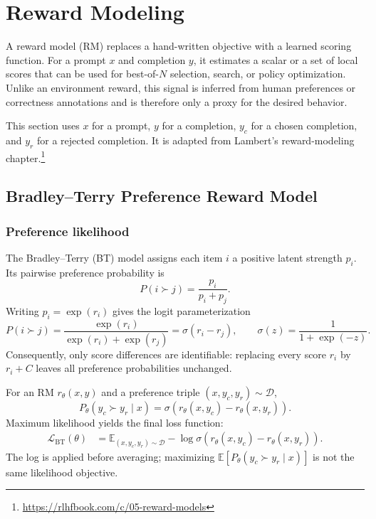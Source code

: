 \section{Reward Modeling}
\label{sec:reward-modeling}

A reward model (RM) replaces a hand-written objective with a learned scoring function.  For a prompt $x$ and completion $y$, it estimates a scalar or a set
of local scores that can be used for best-of-$N$ selection, search, or policy optimization.  Unlike an environment reward, this signal is inferred from human preferences or correctness annotations and is therefore only a proxy for the desired behavior.

This section uses $x$ for a prompt, $y$ for a completion, $y_c$ for a chosen completion, and $y_r$ for a rejected completion.  It is adapted from Lambert's reward-modeling chapter.\footnote{
\url{https://rlhfbook.com/c/05-reward-models}}

\subsection{Bradley--Terry Preference Reward Model}

\subsubsection{Preference likelihood}

The Bradley--Terry (BT) model assigns each item $i$ a positive latent strength
$p_i$.  Its pairwise preference probability is
\begin{equation}
    P(i \succ j)
    =
    \frac{p_i}{p_i+p_j}.
\end{equation}
Writing $p_i=\exp(r_i)$ gives the logit parameterization
\begin{equation}
    P(i \succ j)
    =
    \frac{\exp(r_i)}{\exp(r_i)+\exp(r_j)}
    =
    \sigma(r_i-r_j),
    \qquad
    \sigma(z)=\frac{1}{1+\exp(-z)}.
\end{equation}
Consequently, only score differences are identifiable: replacing every score
$r_i$ by $r_i+C$ leaves all preference probabilities unchanged.

For an RM $r_\theta(x,y)$ and a preference triple
$(x,y_c,y_r)\sim\mathcal{D}$,
\begin{equation}
    P_\theta(y_c\succ y_r\mid x)
    =
    \sigma\!\left(
        r_\theta(x,y_c)-r_\theta(x,y_r)
    \right).
    \label{eq:bt-probability}
\end{equation}
Maximum likelihood yields the final loss function:
\begin{align}
    \mathcal{L}_{\mathrm{BT}}(\theta)
    &=
    \mathbb{E}_{(x,y_c,y_r)\sim\mathcal{D}}
    - \log \sigma\!\left(
        r_\theta(x,y_c)-r_\theta(x,y_r)
    \right).
    \label{eq:bt-loss}
\end{align}
The log is applied before averaging; maximizing
$\mathbb{E}[P_\theta(y_c\succ y_r\mid x)]$ is not the same likelihood
objective.


